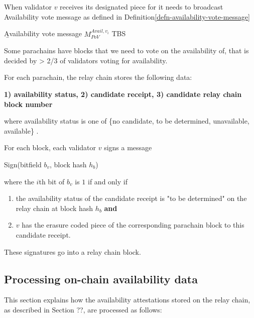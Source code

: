 When validator $v$ receives its designated piece for \blobB it needs to broadcast Availability vote message as defined in Definition\ref{defn-availability-vote-message}
\begin{definition}
  \label{defn-availability-vote-message}
        {\b Availability vote message} $M_{PoV}^{Avail,v_i}$ TBS
\end{definition}

Some parachains have blocks that we need to vote on the availability of, that is decided by > 2/3 of validators voting for availability. 
\newline

For each parachain, the relay chain stores the following data: %

\textbf{1) availability status, 2) candidate receipt, 3) candidate relay chain block number}

where availability status is one of \{no candidate, to be determined, unavailable, available\} .

For each block, each validator $v$ signs a message

Sign(bitfield $b_v$, block hash $h_b$)

where the $i$th bit of $b_v$ is $1$ if and only if

\begin{enumerate}
\item the availability status of the candidate receipt is "to be determined" on the relay chain at block hash $h_b$ \textbf{and}

\item $v$ has the erasure coded piece of the corresponding parachain block to this candidate receipt.
\end{enumerate}

These signatures go into a relay chain block.

\subsection{Processing on-chain availability data}
This section explains how the availability attestations stored on the relay chain, as described in Section ??, are processed as follows:

